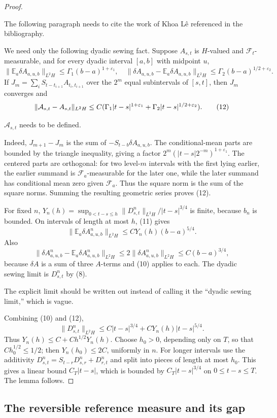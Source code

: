 \documentclass[12pt]{article}
\newcommand{\E}{\mathbb E}
\newcommand{\1}{\mathbf 1}
\newcommand{\calF}{\mathcal F}
\newcommand{\review}[1]{\begin{reviewbox}#1\end{reviewbox}}
\begin{document}
\begin{proof}
\review{The following paragraph needs to cite the work of Khoa Lê referenced in the bibliography.}
We need only the following dyadic sewing fact.  Suppose \(A_{s,t}\) is
\(H\)-valued and \(\calF_t\)-measurable, and for every dyadic interval
\([a,b]\) with midpoint \(u\),
\[
\|\E_a\delta A_{a,u,b}\|_{L^2H}\le \Gamma_1(b-a)^{1+\varepsilon_1},\quad
\|\delta A_{a,u,b}-\E_a\delta A_{a,u,b}\|_{L^2H}
        \le \Gamma_2(b-a)^{1/2+\varepsilon_2}.
\]
If \(J_m=\sum_iS_{t-t_{i+1}}A_{t_i,t_{i+1}}\) over the \(2^m\) equal
subintervals of \([s,t]\), then \(J_m\) converges and
\[
 \|{\cal A}_{s,t}-A_{s,t}\|_{L^2H}
 \le C(\Gamma_1|t-s|^{1+\varepsilon_1}
       +\Gamma_2|t-s|^{1/2+\varepsilon_2}).                 \tag{12}
\]
\review{$\mathcal{A}_{s,t}$ needs to be defined.}
Indeed, \(J_{m+1}-J_m\) is the sum of
\(-S_{t-b}\delta A_{a,u,b}\).  The conditional-mean parts are bounded by the
triangle inequality, giving a factor
\(2^m(|t-s|2^{-m})^{1+\varepsilon_1}\).  The centered parts are orthogonal:
for two level-\(m\) intervals with the first lying earlier, the earlier
summand is \(\calF_a\)-measurable for the later one, while the later summand
has conditional mean zero given \(\calF_a\).  Thus the square norm is the sum
of the square norms.  Summing the resulting geometric series proves (12).

For fixed \(n\), \(Y_n(h)=\sup_{0<t-s\le h}\|D^n_{s,t}\|_{L^2H}/|t-s|^{3/4}\)
is finite, because \(b_n\) is bounded.  On intervals of length at most \(h\),
(11) gives
\[
 \|\E_a\delta A^n_{a,u,b}\|_{L^2H}\le C Y_n(h)(b-a)^{5/4}.
\]
Also
\[
\|\delta A^n_{a,u,b}-\E_a\delta A^n_{a,u,b}\|_{L^2H}
 \le 2\|\delta A^n_{a,u,b}\|_{L^2H}
 \le C(b-a)^{3/4},
\]
because \(\delta A\) is a sum of three \(A\)-terms and (10) applies to each.
The dyadic sewing limit is \(D^n_{s,t}\) by (8).\review{The explicit limit should be written out instead of calling it the ``dyadic sewing limit,'' which is vague.}  Combining (10) and (12),
\[
 \|D^n_{s,t}\|_{L^2H}\le C|t-s|^{3/4}
        +C Y_n(h)|t-s|^{5/4}.
\]
Thus \(Y_n(h)\le C+Ch^{1/2}Y_n(h)\).  Choose \(h_0>0\), depending only on
\(T\), so that \(Ch_0^{1/2}\le1/2\); then \(Y_n(h_0)\le2C\), uniformly in
\(n\).  For longer intervals use the additivity
\(D^n_{s,t}=S_{t-r}D^n_{s,r}+D^n_{r,t}\) and split into pieces of length at
most \(h_0\).  This gives a linear bound \(C_T|t-s|\), which is bounded by
\(C_T|t-s|^{3/4}\) on \(0\le t-s\le T\).  The lemma follows.
\end{proof}

\subsection*{The reversible reference measure and its gap}
\end{document}
